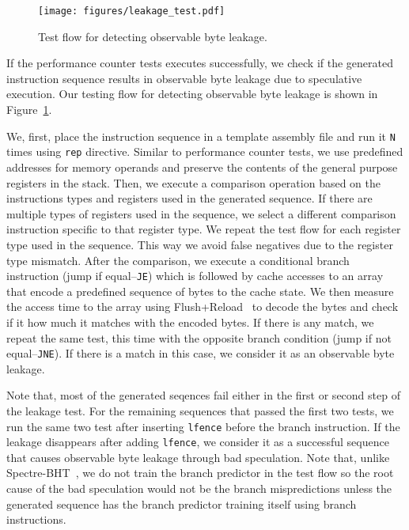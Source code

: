 \begin{figure}[h]
    \vspace{-4mm}
        \centering
        \texttt{[image: figures/leakage\_test.pdf]}
        \caption{Test flow for detecting observable byte leakage.}\label{fig:leakage_test}
    \end{figure}
    
If the performance counter tests executes successfully, we check if the generated instruction sequence results in observable byte leakage due to speculative execution.
Our testing flow for detecting observable byte leakage is shown in Figure~\ref{fig:leakage_test}.

We, first, place the instruction sequence in a template assembly file and run it \texttt{N} times using \texttt{rep} directive. 
Similar to performance counter tests, we use predefined addresses for memory operands and preserve the contents of the general purpose registers in the stack.
Then, we execute a comparison operation based on the instructions types and registers used in the generated sequence. If there are multiple types of registers used in the sequence, we select a different comparison instruction specific to that register type. We repeat the test flow for each register type used in the sequence. This way we avoid false negatives due to the register type mismatch.
After the comparison, we execute a conditional branch instruction (jump if equal--\texttt{JE}) which is followed by cache accesses to an array that encode a predefined sequence of bytes to the cache state. We then measure the access time to the array using Flush+Reload~\cite{yarom2014flush+} to decode the bytes and check if it how much it matches with the encoded bytes.
If there is any match, we repeat the same test, this time with the opposite branch condition (jump if not equal--\texttt{JNE}). If there is a match in this case, we consider it as an observable byte leakage. 

Note that, most of the generated seqences fail either in the first or second step of the leakage test. For the remaining sequences that passed the first two tests, we run the same two test after inserting \texttt{lfence} before the branch instruction. If the leakage disappears after adding \texttt{lfence}, we consider it as a successful sequence that causes observable byte leakage through bad speculation. Note that, unlike Spectre-BHT~\cite{kocher2019spectre}, we do not train the branch predictor in the test flow so the root cause of the bad speculation would not be the branch mispredictions unless the generated sequence has the branch predictor training itself using branch instructions.

